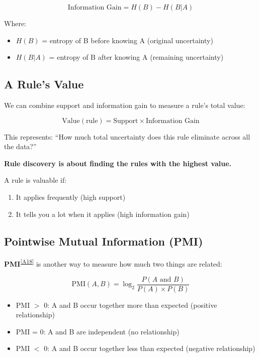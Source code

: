 \documentclass[11pt,a4paper]{article}
\newcommand{\term}[2]{\textcolor{termcolor}{\textbf{#1}}\textsuperscript{\hyperref[#2]{[#2]}}}
\begin{document}
\begin{equation}
\text{Information Gain} = H(B) - H(B|A)
\end{equation}

Where:
\begin{itemize}
    \item $H(B)$ = entropy of B before knowing A (original uncertainty)
    \item $H(B|A)$ = entropy of B after knowing A (remaining uncertainty)
\end{itemize}

\subsection{A Rule's Value}

We can combine support and information gain to measure a rule's total value:

\begin{equation}
\text{Value}(\text{rule}) = \text{Support} \times \text{Information Gain}
\end{equation}

This represents: ``How much total uncertainty does this rule eliminate across all the data?''

\begin{keyidea}
\textbf{Rule discovery is about finding the rules with the highest value.}

A rule is valuable if:
\begin{enumerate}
    \item It applies frequently (high support)
    \item It tells you a lot when it applies (high information gain)
\end{enumerate}
\end{keyidea}

\subsection{Pointwise Mutual Information (PMI)}

\term{PMI}{A18} is another way to measure how much two things are related:

\begin{equation}
\text{PMI}(A, B) = \log_2 \frac{P(A \text{ and } B)}{P(A) \times P(B)}
\end{equation}

\begin{itemize}
    \item PMI $>$ 0: A and B occur together more than expected (positive relationship)
    \item PMI = 0: A and B are independent (no relationship)
    \item PMI $<$ 0: A and B occur together less than expected (negative relationship)
\end{itemize}
\end{document}
